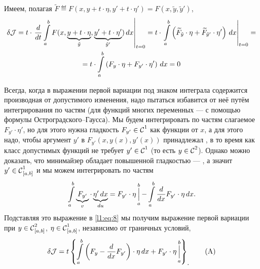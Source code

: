 Имеем, полагая $\widetilde{F}\eqdef F(x,y+t\cdot\eta,y'+t\cdot\eta')=F(x,\tilde{y},\tilde{y}')$,
\begin{multline}
	\label{l1:eq:8}
	\delta\J=t\cdot\left.\der{}{t}\int\limits_a^b F(x,\underbrace{y+t\cdot\eta}_{\tilde{y}},\underbrace{y'+t\cdot\eta'}_{\tilde{y}'})\,\dd{x}\right|_{t=0}=t\cdot\left.\int\limits_a^b \left(\widetilde{F}_{\tilde{y}}\cdot\eta+\widetilde{F}_{\tilde{y}'}\cdot\eta'\right)\,\dd{x}\right|_{t=0}=\\
	=t\cdot\int\limits_a^b \left({F}_{{y}}\cdot\eta+{F}_{{y}'}\cdot\eta'\right)\,\dd{x}=0
\end{multline}

Всегда, когда в выражении первой вариации под знаком интеграла содержится производная от допустимого изменения, надо пытаться избавится от неё путём интегрирования по частям (для функций многих переменных --- с помощью формулы Остроградского--Гаусса). Мы будем интегрировать по частям слагаемое $F_{y'}\cdot\eta'$, но для этого нужна гладкость $F_{y'}\in\Cfn[]{1}$ как функции от $x$, а для этого надо, чтобы аргумент $y'$ в $F_{y'}(x,y(x),y'(x))$ принадлежал , в то время как класс допустимых функций не требует $y'\in\Cfn[]{1}$ (то есть $y\in\Cfn[]{2}$). Однако можно доказать, что минимайзер обладает повышенной гладкостью --- , а значит $y'\in\Cfn[{[a,b]}]{1}$ и мы можем интегрировать по частям
\begin{equation}
	\label{l1:eq:9}
	\hfill\int\limits_a^b \underbrace{F_{y'}}_{v}\cdot\underbrace{\eta'\,\dd{x}}_{du}=F_{y'}\cdot\eta\mathop{\Big|}\limits_a^b-\int\limits_a^b \der{}{x}F_{y'}\cdot\eta\,\dd{x}.\hfill
\end{equation}
Подставляя это выражение в \eqref{l1:eq:8} мы получим выражение первой вариации при $y\in\Cfn[{[a,b]}]{2}$, $\eta\in\Cfn[{[a,b]}]{1}$, независимо от граничных условий,
\begin{equation}
	\label{l1:eq:A}
	\hfill \delta\J=t\left\{\int\limits_a^b\left(F_y-\der{}{x}F_{y'}\right)\cdot\eta\,\dd{x}+F_{y'}\cdot\eta\mathop{\Big|}\limits_a^b\right\}_{\displaystyle.}\hfill\tag{A}
\end{equation}

